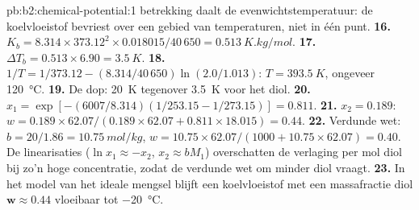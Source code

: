 \begin{solution}{pb:b2:chemical-potential:1}
betrekking daalt de evenwichtstemperatuur: de koelvloeistof bevriest over een gebied
van temperaturen, niet in één punt.
\textbf{16.} $K_b = 8.314 \times 373.12^2 \times 0.018015/40\,650 =
\qty{0.513}{K.kg/mol}$.
\textbf{17.} $\Delta T_b = 0.513 \times 6.90 = \qty{3.5}{K}$.
\textbf{18.} $1/T = 1/373.12 - (8.314/40\,650)\ln(2.0/1.013)$: $T = \qty{393.5}{K}$,
ongeveer \qty{120}{\celsius}.
\textbf{19.} De dop: \qty{20}{K} tegenover \qty{3.5}{K} voor het diol.
\textbf{20.} $x_1 = \exp[-(6007/8.314)(1/253.15 - 1/273.15)] = 0.811$.
\textbf{21.} $x_2 = 0.189$: $w = 0.189 \times 62.07/(0.189 \times 62.07 + 0.811
\times 18.015) = 0.44$.
\textbf{22.} Verdunde wet: $b = 20/1.86 = \qty{10.75}{mol/kg}$, $w = 10.75 \times
62.07/(1000 + 10.75 \times 62.07) = 0.40$. De linearisaties ($\ln x_1 \approx
-x_2$, $x_2 \approx bM_1$) overschatten de verlaging per mol diol bij zo'n
hoge concentratie, zodat de verdunde wet om minder diol vraagt.
\textbf{23.} In het model van het ideale mengsel blijft een koelvloeistof met een massafractie
diol $\boldsymbol{w \approx 0.44}$ vloeibaar tot \qty{-20}{\celsius}.
\end{solution}

